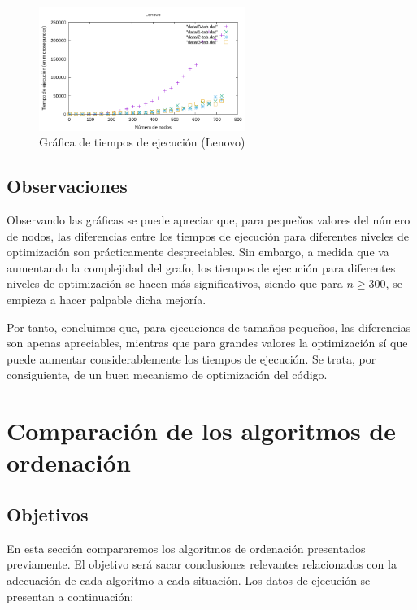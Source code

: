 \documentclass{homework}
\begin{document}
    \begin{figure}[H]
        \centering
        \includegraphics[width=0.6\textwidth]{../data/lenovo-opt.pdf}
        \caption{Gráfica de tiempos de ejecución (Lenovo)}
    \end{figure}

    \vspace{3cm} 

    \subsection{Observaciones}

    Observando las gráficas se puede apreciar que, para pequeños valores del número de nodos, las diferencias entre los
    tiempos de ejecución para diferentes niveles de optimización son prácticamente despreciables. Sin embargo, a medida
    que va aumentando la complejidad del grafo, los tiempos de ejecución para diferentes niveles de optimización se hacen
    más significativos, siendo que para $n \geq 300$, se empieza a hacer palpable dicha mejoría. 

    Por tanto, concluimos que, para ejecuciones de tamaños pequeños, las diferencias son apenas apreciables, mientras que
    para grandes valores la optimización sí que puede aumentar considerablemente los tiempos de ejecución. Se trata, por
    consiguiente, de un buen mecanismo de optimización del código. 

    \newpage
    \section{Comparación de los algoritmos de ordenación}

    \subsection{Objetivos}

    En esta sección compararemos los algoritmos de ordenación presentados previamente. El objetivo será
    sacar conclusiones relevantes relacionados con la adecuación de cada algoritmo a cada situación. Los datos de ejecución
    se presentan a continuación:
\end{document}
